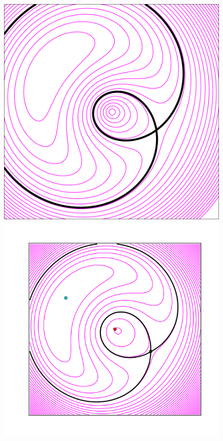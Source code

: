 \begin{figure}
  \vskip-20pt
  \includegraphics[width=\myplotswidth]{fig/ASW000102p_006941_arriv} 
  \includegraphics[width=\myplotswidth]{fig/006941_spaghetti} \\

\end{figure}

